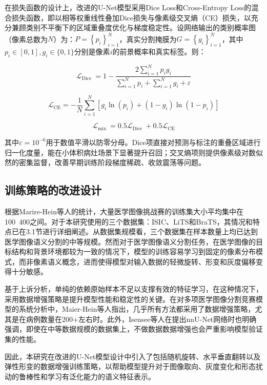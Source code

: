 在损失函数的设计上，改进的U-Net模型采用Dice Loss和Cross-Entropy Loss的混合损失函数，即以相等权重线性叠加Dice损失与像素级交叉熵（CE）损失，以充分兼顾类别不平衡下的区域重叠度优化与梯度稳定性。设网络输出的类别概率图（像素总数为$N$）为：$ P=\left\{p_{i}\right\}_{i=1}^{N} $，真实分割掩膜为$ G=\left\{g_{i}\right\}_{i=1}^{N} $，其中$ p_{i} \in[0,1], g_{i} \in\{0,1\}$分别是像素$i$的前景概率和真实标签。则：

\begin{equation}
    \mathcal{L}_{\text {Dice }}=1-\frac{2 \sum_{i=1}^{N} p_{i} g_{i}}{\sum_{i=1}^{N} p_{i}+\sum_{i=1}^{N} g_{i}+\varepsilon}
\end{equation}

\begin{equation}
    \mathcal{L}_{\mathrm{CE}}=-\frac{1}{N} \sum_{i=1}^{N}\left[g_{i} \ln \left(p_{i}\right)+\left(1-g_{i}\right) \ln \left(1-p_{i}\right)\right]
\end{equation}

\begin{equation}
    \mathcal{L}_{\text {mix }}=0.5 \mathcal{L}_{\text {Dice }}+0.5 \mathcal{L}_{\mathrm{CE}}
\end{equation}

其中$ \varepsilon=10^{-6} $用于数值平滑以防零分母。Dice项直接对预测与标注的重叠区域进行归一化度量，能在小体积病灶场景下显著提升召回；交叉熵项则提供像素级对数似然的密集监督，改善早期训练阶段梯度稀疏、收敛震荡等问题。

\subsection{训练策略的改进设计}

根据Marire-Hein等人\cite{maier-hein2018a}的统计，大量医学图像挑战赛的训练集大小平均集中在100~400之间。对于本研究使用的三个数据集：ISIC、LiTS和BraTS，其情况和特点已在3.1节进行详细阐述。从数据集规模看，三个数据集在样本数量上均已达到医学图像语义分割的中等规模。然而对于医学图像语义分割任务，在医学图像的目标结构和背景环境都较为一致的情况下，模型的训练容易学习到固定的像素分布模式，而非像素语义概念，进而使得模型对输入数据的轻微旋转、形变和灰度偏移变得十分敏感。

基于上诉分析，单纯的依赖原始样本不足以支撑有效的特征学习，在这种情况下，采用数据增强策略是提升模型性能和稳定性的关键。在对多项医学图像分割竞赛模型的系统分析中，Maier-Hein等人\cite{maier-hein2018a}指出，几乎所有方法都采用了数据增强策略，尤其是在病例数量在200+左右时。此外，Isensee等人在提出nnU-Net网络时也明确强调\cite{isensee2021}，即使在中等数据规模的数据集上，不做数据数据增强也会严重影响模型验证集的性能。

因此，本研究在改进的U-Net模型设计中引入了包括随机旋转、水平垂直翻转以及弹性形变的数据增强训练策略，以帮助模型提升对于图像取向、灰度变化和形态扰动的鲁棒性和学习有泛化能力的语义特征表示。